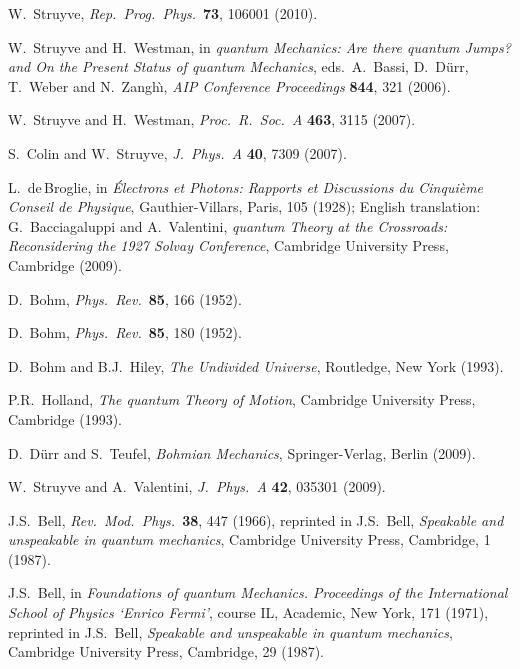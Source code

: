 \documentclass[11pt]{article}
\begin{document}
\begin{thebibliography}{10}

{W.\ Struyve, {\em Rep.\ Prog.\ Phys.}\ {\bf 73}, 106001 (2010).}

{W.\ Struyve and H.\ Westman, in {\em quantum Mechanics: Are there quantum Jumps? and On the Present Status of quantum Mechanics}, eds.\ A.\ Bassi, D.\ D\"urr, T.\ Weber  and N.\ Zangh\`\i, {\em AIP Conference Proceedings} {\bf 844}, 321 (2006).}

{W.\ Struyve and H.\ Westman, {\em Proc.\ R.\ Soc.\ A} {\bf 463}, 3115 (2007).}

{S.\ Colin and W.\ Struyve, {\em J.\ Phys.\ A} {\bf 40}, 7309 (2007).}

{L.\ de$\,$Broglie, in {\em \'Electrons et Photons: Rapports et Discussions du
  Cinqui\`eme Conseil de Physique}, Gauthier-Villars, Paris, 105 (1928);
  English translation: G.\ Bacciagaluppi and A.\ Valentini, {\em quantum Theory
  at the Crossroads: Reconsidering the 1927 Solvay Conference}, Cambridge
  University Press, Cambridge (2009).}

{D.\ Bohm, {\em Phys.\ Rev.}\ {\bf 85}, 166 (1952).}

{D.\ Bohm, {\em Phys.\ Rev.}\ {\bf 85}, 180 (1952).}

{D.\ Bohm and B.J.\ Hiley, {\em The Undivided Universe}, Routledge, New York (1993).}

{P.R.\ Holland, {\em The quantum Theory of Motion}, Cambridge University Press, Cambridge (1993).}

{D.\ D\"urr and S.\ Teufel, {\em Bohmian Mechanics}, Springer-Verlag, Berlin (2009).}

{W.\ Struyve and A.\ Valentini, {\em J.\ Phys.\ A} {\bf 42}, 035301 (2009).}

{J.S.\ Bell, {\em  Rev.\ Mod.\ Phys.}\ {\bf 38}, 447 (1966), reprinted in J.S.\ Bell, {\em
  Speakable and unspeakable in quantum mechanics}, Cambridge University Press,
  Cambridge, 1 (1987).}

{J.S.\ Bell, in {\em  Foundations of quantum Mechanics. Proceedings of the International School of
  Physics `Enrico Fermi'}, course IL, Academic, New York, 171 (1971),
  reprinted in J.S.\ Bell, {\em Speakable and unspeakable in quantum
  mechanics}, Cambridge University Press, Cambridge, 29 (1987).}


\end{thebibliography}
\end{document}
